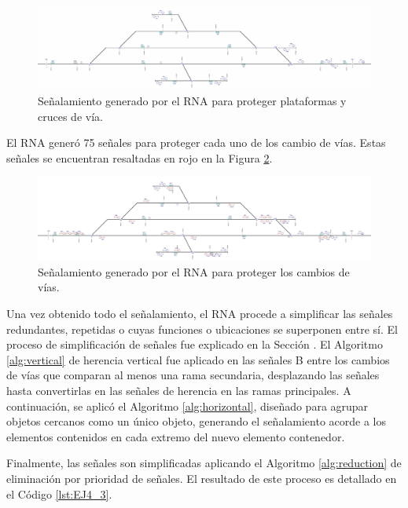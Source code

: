 \begin{figure}[H]
	\centering
	\includegraphics[width=1\textwidth]{resultados-obtenidos/ejemplo4/images/4_step3.png}
	\centering\caption{Señalamiento generado por el RNA para proteger plataformas y cruces de vía.}
	\label{fig:EJ4_5}
\end{figure}

El RNA generó 75 señales para proteger cada uno de los cambio de vías. Estas señales se encuentran resaltadas en rojo en la Figura \ref{fig:EJ4_6}.

\begin{figure}[H]
	\centering
	\includegraphics[width=1\textwidth]{resultados-obtenidos/ejemplo4/images/4_step4.png}
	\centering\caption{Señalamiento generado por el RNA para proteger los cambios de vías.}
	\label{fig:EJ4_6}
\end{figure}

Una vez obtenido todo el señalamiento, el RNA procede a simplificar las señales redundantes, repetidas o cuyas funciones o ubicaciones se superponen entre sí. El proceso de simplificación de señales fue explicado en la Sección \label{sec:simplificacion}. El Algoritmo \ref{alg:vertical} de herencia vertical fue aplicado en las señales B entre los cambios de vías que comparan al menos una rama secundaria, desplazando las señales hasta convertirlas en las señales de herencia en las ramas principales. A continuación, se aplicó el Algoritmo \ref{alg:horizontal}, diseñado para agrupar objetos cercanos como un único objeto, generando el señalamiento acorde a los elementos contenidos en cada extremo del nuevo elemento contenedor.

Finalmente, las señales son simplificadas aplicando el Algoritmo \ref{alg:reduction} de eliminación por prioridad de señales. El resultado de este proceso es detallado en el Código \ref{lst:EJ4_3}.

